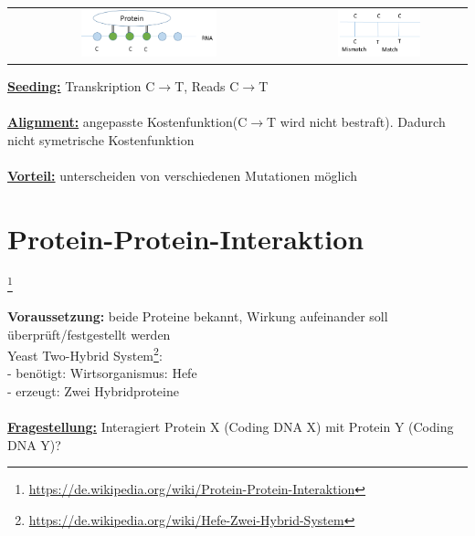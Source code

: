 \begin{tabular}{cc}
\includegraphics[width=0.5\textwidth]{lectures/160429/pix/par_clip1.png} & \includegraphics[width=0.5\textwidth]{lectures/160429/pix/par_clip2.png}
\end{tabular}

\textbf{\underline{Seeding:}} Transkription C$\rightarrow$T, Reads C$\rightarrow$T\\\\
\textbf{\underline{Alignment:}} angepasste Kostenfunktion(C$\rightarrow$T wird nicht bestraft). Dadurch nicht symetrische Kostenfunktion
\\\\
\textbf{\underline{Vorteil:}} unterscheiden von verschiedenen Mutationen möglich

\newpage

\section{Protein-Protein-Interaktion}\footnote{\url{https://de.wikipedia.org/wiki/Protein-Protein-Interaktion}}

\textbf{Voraussetzung: }beide Proteine bekannt, Wirkung aufeinander soll überprüft/festgestellt werden\\

Yeast Two-Hybrid System\footnote{\url{https://de.wikipedia.org/wiki/Hefe-Zwei-Hybrid-System}}:\\
 - benötigt: Wirtsorganismus: Hefe\\
 - erzeugt: Zwei Hybridproteine
\\\\ 
\textbf{\underline{Fragestellung:}} Interagiert Protein X (Coding DNA X) mit Protein Y (Coding DNA Y)?

